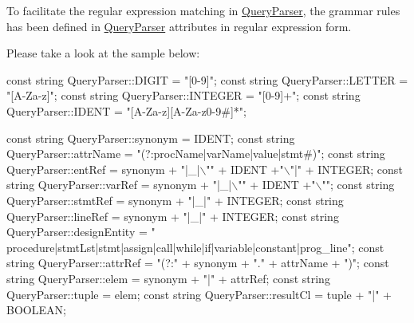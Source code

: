 To facilitate the regular expression matching in \hyperlink{class_query_parser}{Query\+Parser}, the grammar rules has been defined in \hyperlink{class_query_parser}{Query\+Parser} attributes in regular expression form.

Please take a look at the sample below\+: 
\begin{DoxyCode}
\textcolor{keyword}{const} \textcolor{keywordtype}{string} QueryParser::DIGIT = \textcolor{stringliteral}{"[0-9]"};
\textcolor{keyword}{const} \textcolor{keywordtype}{string} QueryParser::LETTER = \textcolor{stringliteral}{"[A-Za-z]"};
\textcolor{keyword}{const} \textcolor{keywordtype}{string} QueryParser::INTEGER = \textcolor{stringliteral}{"[0-9]+"};
\textcolor{keyword}{const} \textcolor{keywordtype}{string} QueryParser::IDENT = \textcolor{stringliteral}{"[A-Za-z][A-Za-z0-9#]*"};

\textcolor{keyword}{const} \textcolor{keywordtype}{string} QueryParser::synonym = IDENT;
\textcolor{keyword}{const} \textcolor{keywordtype}{string} QueryParser::attrName = \textcolor{stringliteral}{"(?:procName|varName|value|stmt#)"};
\textcolor{keyword}{const} \textcolor{keywordtype}{string} QueryParser::entRef = synonym + \textcolor{stringliteral}{"|\_|\(\backslash\)""} + IDENT +\textcolor{stringliteral}{"\(\backslash\)"|"} + INTEGER;
\textcolor{keyword}{const} \textcolor{keywordtype}{string} QueryParser::varRef = synonym + \textcolor{stringliteral}{"|\_|\(\backslash\)""} + IDENT +\textcolor{stringliteral}{"\(\backslash\)""};
\textcolor{keyword}{const} \textcolor{keywordtype}{string} QueryParser::stmtRef = synonym + \textcolor{stringliteral}{"|\_|"} + INTEGER;
\textcolor{keyword}{const} \textcolor{keywordtype}{string} QueryParser::lineRef = synonym + \textcolor{stringliteral}{"|\_|"} + INTEGER;
\textcolor{keyword}{const} \textcolor{keywordtype}{string} QueryParser::designEntity = \textcolor{stringliteral}{"
      procedure|stmtLst|stmt|assign|call|while|if|variable|constant|prog\_line"};
\textcolor{keyword}{const} \textcolor{keywordtype}{string} QueryParser::attrRef = \textcolor{stringliteral}{"(?:"} + synonym + \textcolor{stringliteral}{"."} + attrName + \textcolor{stringliteral}{")"};
\textcolor{keyword}{const} \textcolor{keywordtype}{string} QueryParser::elem = synonym + \textcolor{stringliteral}{"|"} + attrRef;
\textcolor{keyword}{const} \textcolor{keywordtype}{string} QueryParser::tuple = elem;
\textcolor{keyword}{const} \textcolor{keywordtype}{string} QueryParser::resultCl = tuple + \textcolor{stringliteral}{"|"} + BOOLEAN;
\end{DoxyCode}


